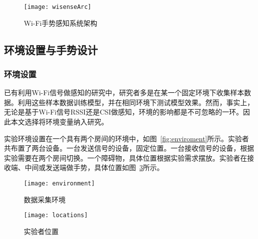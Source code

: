 \begin{figure}[htbp] %
  \centering
  \texttt{[image: wisenseArc]}
  \caption[Wi-Fi手势感知系统架构]{Wi-Fi手势感知系统架构}
  \label{fig:wisenseArc}
\end{figure}

\subsection{环境设置与手势设计}
\subsubsection{环境设置}

已有利用Wi-Fi信号做感知的研究中，研究者多是在某一个固定环境下收集样本数据。利用这些样本数据训练模型，并在相同环境下测试模型效果。然而，事实上，无论是基于Wi-Fi信号RSSI还是CSI做感知，环境的影响都是不可忽略的一环。因此本文选择将环境变量纳入研究。

实验环境设置在一个具有两个房间的环境中，如图~\ref{fig:enviroment}所示。实验者共布置了两台设备。一台发送信号的设备，固定位置。一台接收信号的设备，根据实验需要在两个房间切换。一个障碍物，具体位置根据实验需求摆放。实验者在接收端、中间或发送端做手势，具体位置如图~\ref{fig:locations}所示。

\begin{figure}[htbp] %
  \centering
  \texttt{[image: environment]}
  \caption{数据采集环境}
  \label{fig:environment}
\end{figure}

\begin{figure}[htbp] %
  \centering
  \texttt{[image: locations]}
  \caption{实验者位置}
  \label{fig:locations}
\end{figure}



